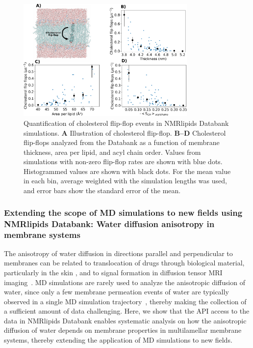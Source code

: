 \documentclass[fleqn,10pt]{wlscirep}
\begin{document}
\begin{figure}[htb]
    \centering
    \includegraphics[width=88mm]{Figures/CholFlipFlops.pdf}
    \caption{Quantification of cholesterol flip-flop events in NMRlipids Databank simulations. 
    \textbf{A} Illustration of cholesterol flip-flop.  
      \textbf{B--D} Cholesterol flip-flops analyzed from the Databank as a function of membrane thickness, area per lipid, and acyl chain order. Values from simulations with non-zero flip-flop rates are shown with blue dots. Histogrammed values are shown with black dots. For the mean value in each bin, average weighted with the simulation lengths was used, and error bars show the standard error of the mean.
    }
    \label{fig:flip-flops}
\end{figure}



\subsubsection{Extending the scope of MD simulations to new fields using NMRlipids Databank: Water diffusion anisotropy in membrane systems}
The anisotropy of water diffusion in directions parallel and perpendicular to membranes can be related to translocation of drugs through biological material, particularly in the skin \cite{hansen13,wen18,nitsche19,roberts21}, and to signal formation in diffusion tensor MRI imaging~\cite{topgaard20}. MD simulations are rarely used to analyze the anisotropic diffusion of water, since only a few membrane permeation events of water are typically observed in a single MD simulation trajectory~\cite{venable19,camilo2022}, thereby making the collection of a sufficient amount of data challenging. Here, we show that the API access to the data in NMRlipids Databank enables systematic analysis on how the anisotropic diffusion of water depends on membrane properties in multilamellar membrane systems, thereby extending the application of MD simulations to new fields. 
\end{document}

